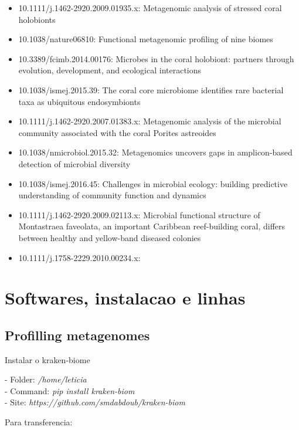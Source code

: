 \documentclass[12pt, a4paper]{report}
\begin{document}
\begin{itemize}
\item 10.1111/j.1462-2920.2009.01935.x: Metagenomic analysis of stressed coral holobionts
\item 10.1038/nature06810: Functional metagenomic profiling of nine biomes
\item 10.3389/fcimb.2014.00176: Microbes in the coral holobiont: partners through evolution, development, and ecological interactions
\item 10.1038/ismej.2015.39: The coral core microbiome identifies rare bacterial
taxa as ubiquitous endosymbionts
\item 10.1111/j.1462-2920.2007.01383.x: Metagenomic analysis of the microbial community
associated with the coral Porites astreoides
\item  10.1038/nmicrobiol.2015.32: Metagenomics uncovers gaps in amplicon-based
detection of microbial diversity
\item 10.1038/ismej.2016.45: Challenges in microbial ecology: building predictive
understanding of community function and dynamics
\item 10.1111/j.1462-2920.2009.02113.x: Microbial functional structure of Montastraea faveolata,
an important Caribbean reef-building coral, differs
between healthy and yellow-band diseased colonies
\item 10.1111/j.1758-2229.2010.00234.x: 
\end{itemize}

\chapter{Softwares, instalacao e linhas}

\section{Profilling metagenomes}

Instalar o kraken-biome

\begin{tcolorbox}[width=6.5in]
- Folder: \textit{/home/leticia}\\
- Command: \textit{pip install kraken-biom}\\
- Site: \textit{https://github.com/smdabdoub/kraken-biom}
\end{tcolorbox}


Para transferencia: 


 
 



 
\end{document}
